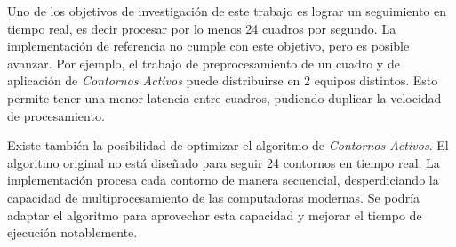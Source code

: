 Uno de los objetivos de investigación de este trabajo es lograr un seguimiento
en tiempo real, es decir procesar por lo menos 24 cuadros por segundo. La
implementación de referencia no cumple con este objetivo, pero es posible
avanzar. Por ejemplo, el trabajo de preprocesamiento de un cuadro y de
aplicación de \textit{Contornos Activos} puede distribuirse en 2 equipos
distintos. Esto permite tener una menor latencia entre cuadros, pudiendo
duplicar la velocidad de procesamiento.

Existe también la posibilidad de optimizar el algoritmo de \textit{Contornos
Activos}. El algoritmo original no está diseñado para seguir 24 contornos en
tiempo real. La implementación procesa cada contorno de manera secuencial,
desperdiciando la capacidad de multiprocesamiento de las computadoras modernas.
Se podría adaptar el algoritmo para aprovechar esta capacidad y mejorar el
tiempo de ejecución notablemente.

